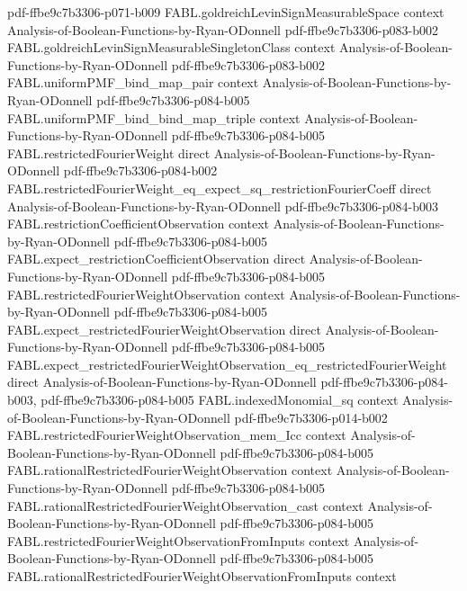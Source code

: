 \begin{theorem}
  {pdf-ffbe9c7b3306-p071-b009}
\proofstep
  {FABL.goldreichLevinSignMeasurableSpace}
  {context}
  {Analysis-of-Boolean-Functions-by-Ryan-ODonnell}
  {pdf-ffbe9c7b3306-p083-b002}
\proofstep
  {FABL.goldreichLevinSignMeasurableSingletonClass}
  {context}
  {Analysis-of-Boolean-Functions-by-Ryan-ODonnell}
  {pdf-ffbe9c7b3306-p083-b002}
\proofstep
  {FABL.uniformPMF_bind_map_pair}
  {context}
  {Analysis-of-Boolean-Functions-by-Ryan-ODonnell}
  {pdf-ffbe9c7b3306-p084-b005}
\proofstep
  {FABL.uniformPMF_bind_bind_map_triple}
  {context}
  {Analysis-of-Boolean-Functions-by-Ryan-ODonnell}
  {pdf-ffbe9c7b3306-p084-b005}
\proofstep
  {FABL.restrictedFourierWeight}
  {direct}
  {Analysis-of-Boolean-Functions-by-Ryan-ODonnell}
  {pdf-ffbe9c7b3306-p084-b002}
\proofstep
  {FABL.restrictedFourierWeight_eq_expect_sq_restrictionFourierCoeff}
  {direct}
  {Analysis-of-Boolean-Functions-by-Ryan-ODonnell}
  {pdf-ffbe9c7b3306-p084-b003}
\proofstep
  {FABL.restrictionCoefficientObservation}
  {context}
  {Analysis-of-Boolean-Functions-by-Ryan-ODonnell}
  {pdf-ffbe9c7b3306-p084-b005}
\proofstep
  {FABL.expect_restrictionCoefficientObservation}
  {direct}
  {Analysis-of-Boolean-Functions-by-Ryan-ODonnell}
  {pdf-ffbe9c7b3306-p084-b005}
\proofstep
  {FABL.restrictedFourierWeightObservation}
  {context}
  {Analysis-of-Boolean-Functions-by-Ryan-ODonnell}
  {pdf-ffbe9c7b3306-p084-b005}
\proofstep
  {FABL.expect_restrictedFourierWeightObservation}
  {direct}
  {Analysis-of-Boolean-Functions-by-Ryan-ODonnell}
  {pdf-ffbe9c7b3306-p084-b005}
\proofstep
  {FABL.expect_restrictedFourierWeightObservation_eq_restrictedFourierWeight}
  {direct}
  {Analysis-of-Boolean-Functions-by-Ryan-ODonnell}
  {pdf-ffbe9c7b3306-p084-b003,
    pdf-ffbe9c7b3306-p084-b005}
\proofstep
  {FABL.indexedMonomial_sq}
  {context}
  {Analysis-of-Boolean-Functions-by-Ryan-ODonnell}
  {pdf-ffbe9c7b3306-p014-b002}
\proofstep
  {FABL.restrictedFourierWeightObservation_mem_Icc}
  {context}
  {Analysis-of-Boolean-Functions-by-Ryan-ODonnell}
  {pdf-ffbe9c7b3306-p084-b005}
\proofstep
  {FABL.rationalRestrictedFourierWeightObservation}
  {context}
  {Analysis-of-Boolean-Functions-by-Ryan-ODonnell}
  {pdf-ffbe9c7b3306-p084-b005}
\proofstep
  {FABL.rationalRestrictedFourierWeightObservation_cast}
  {context}
  {Analysis-of-Boolean-Functions-by-Ryan-ODonnell}
  {pdf-ffbe9c7b3306-p084-b005}
\proofstep
  {FABL.restrictedFourierWeightObservationFromInputs}
  {context}
  {Analysis-of-Boolean-Functions-by-Ryan-ODonnell}
  {pdf-ffbe9c7b3306-p084-b005}
\proofstep
  {FABL.rationalRestrictedFourierWeightObservationFromInputs}
  {context}

\end{theorem}
